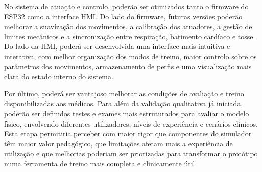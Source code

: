 No sistema de atuação e controlo, poderão ser otimizados tanto o firmware do ESP32 como a interface HMI. Do lado do firmware, futuras versões poderão melhorar a suavização dos movimentos, a calibração dos atuadores, a gestão de limites mecânicos e a sincronização entre respiração, batimento cardíaco e tosse. Do lado da HMI, poderá ser desenvolvida uma interface mais intuitiva e interativa, com melhor organização dos modos de treino, maior controlo sobre os parâmetros dos movimentos, armazenamento de perfis e uma visualização mais clara do estado interno do sistema.

Por último, poderá ser vantajoso melhorar as condições de avaliação e treino disponibilizadas aos médicos. Para além da validação qualitativa já iniciada, poderão ser definidos testes e exames mais estruturados para avaliar o modelo físico, envolvendo diferentes utilizadores, níveis de experiência e cenários clínicos. Esta etapa permitiria perceber com maior rigor que componentes do simulador têm maior valor pedagógico, que limitações afetam mais a experiência de utilização e que melhorias poderiam ser priorizadas para transformar o protótipo numa ferramenta de treino mais completa e clinicamente útil.
